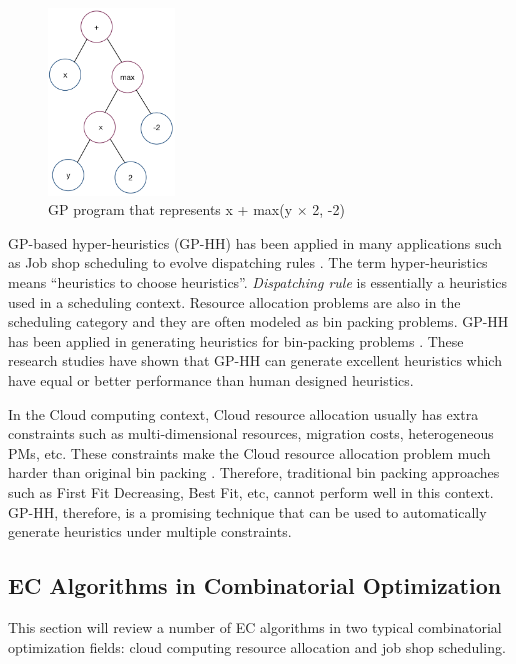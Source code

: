 \begin{figure}
	\centering
	\includegraphics[width=0.3\textwidth]{pics/gp-tree.png}
	\caption{GP program that represents x + max(y $\times$ 2, -2)}
	\label{fig:gp_program}
\end{figure}


GP-based hyper-heuristics (GP-HH)  has been applied in many applications such as Job shop scheduling to evolve dispatching rules \cite{Nguyen:2014eu}. The term hyper-heuristics \cite{Cowling:2000ek} means ``heuristics to choose heuristics''.
\emph{Dispatching rule} is essentially a heuristics \cite{Panwalkar:1977fw} used in a scheduling context. 
Resource allocation problems are also in the scheduling category and they are often modeled as bin packing problems. 
GP-HH has been applied in generating heuristics for bin-packing problems \cite{Poli:2007kt,Sim:2013fe,Burke:2012gs}. These research studies have shown that GP-HH can generate excellent heuristics which have equal or better performance than human designed heuristics.

In the Cloud computing context,  Cloud resource allocation usually has extra constraints such as multi-dimensional resources, migration costs, heterogeneous PMs, etc. These constraints make the Cloud resource allocation problem much harder than original bin packing \cite{Mann:2015ua}. Therefore, traditional bin packing approaches such as First Fit Decreasing, Best Fit, etc, cannot perform well in this context.  GP-HH, therefore, is a promising technique that can be used to automatically generate heuristics under multiple constraints.

\subsection{EC Algorithms in Combinatorial Optimization}
This section will review a number of EC algorithms in two typical combinatorial optimization fields: cloud computing resource allocation and job shop scheduling. 

